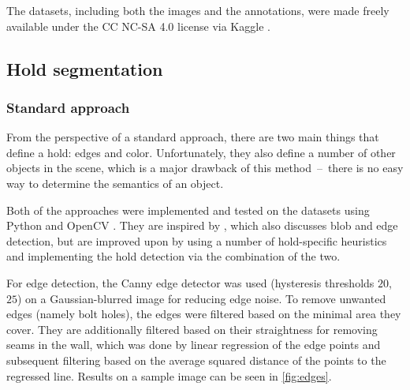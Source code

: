 \documentclass[final]{cvpr}
\begin{document}
The datasets, including both the images and the annotations, were made freely available under the CC NC-SA 4.0 license via Kaggle \cite{Our}.

\subsection{Hold segmentation} %

\subsubsection{Standard approach} %

From the perspective of a standard approach, there are two main things that define a hold: edges and color.
Unfortunately, they also define a number of other objects in the scene, which is a major drawback of this method~--~there is no easy way to determine the semantics of an object.

Both of the approaches were implemented and tested on the datasets using Python and OpenCV \cite{opencv}.
They are inspired by \cite{ClimbingAnalysis}, which also discusses blob and edge detection, but are improved upon by using a number of hold-specific heuristics and implementing the hold detection via the combination of the two.

For edge detection, the Canny edge detector was used (hysteresis thresholds $20$, $25$) on a Gaussian-blurred image for reducing edge noise.
To remove unwanted edges (namely bolt holes), the edges were filtered based on the minimal area they cover.
They are additionally filtered based on their straightness for removing seams in the wall, which was done by linear regression of the edge points and subsequent filtering based on the average squared distance of the points to the regressed line.
Results on a sample image can be seen in \autoref{fig:edges}.
\end{document}

